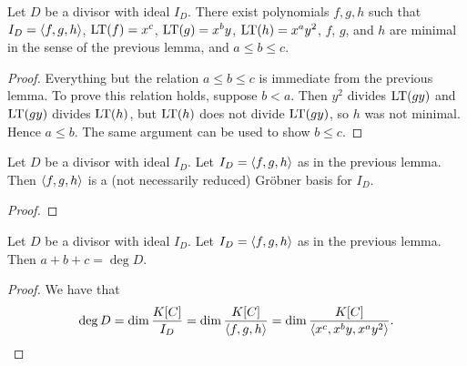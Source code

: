 \begin{lemma}
  Let $D$ be a divisor with ideal $I_D$.
  There exist polynomials $f, g, h$ such that $I_D = \left\langle f, g, h \right\rangle$,
  $\operatorname{LT}(f) = x^c$,
  $\operatorname{LT}(g) = x^by$,
  $\operatorname{LT}(h) = x^ay^2$,
  $f$, $g$, and $h$ are minimal in the sense of the previous lemma,
  and $a \leq b \leq c$.
\end{lemma}
\begin{proof}
  Everything but the relation $a \leq b \leq c$ is immediate from the previous lemma.
  To prove this relation holds, suppose $b < a$.
  Then $y^2$ divides $\operatorname{LT}(gy)$ and $\operatorname{LT}(gy)$ divides $\operatorname{LT}(h)$, but $\operatorname{LT}(h)$ does not divide $\operatorname{LT}(gy)$,
  so $h$ was not minimal. Hence $a \leq b$.
  The same argument can be used to show $b \leq c$.
\end{proof}

\begin{lemma}
  Let $D$ be a divisor with ideal $I_D$.
  Let $I_D = \left\langle f, g, h \right\rangle$ as in the previous lemma.
  Then $\left\langle f, g, h \right\rangle$ is a (not necessarily reduced) Gr\"obner basis for $I_D$.
\end{lemma}
\begin{proof}
\end{proof}

\begin{lemma}
  Let $D$ be a divisor with ideal $I_D$.
  Let $I_D = \left\langle f, g, h \right\rangle$ as in the previous lemma.
  Then $a + b + c = \deg D$.
\end{lemma}
\begin{proof}
  We have that
  \[ \deg D = \dim \frac {K[C]}{I_D} = \dim \frac {K[C]}{\left\langle f,g,h \right\rangle}
            = \dim \frac {K[C]}{\left\langle x^c, x^by, x^ay^2 \right\rangle}. \]
\end{proof}

